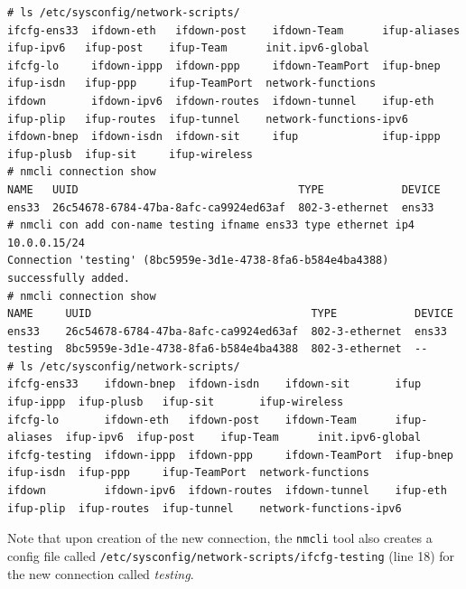 \vspace{-15pt}
\begin{verbatim}
# ls /etc/sysconfig/network-scripts/
ifcfg-ens33  ifdown-eth   ifdown-post    ifdown-Team      ifup-aliases  ifup-ipv6   ifup-post    ifup-Team      init.ipv6-global
ifcfg-lo     ifdown-ippp  ifdown-ppp     ifdown-TeamPort  ifup-bnep     ifup-isdn   ifup-ppp     ifup-TeamPort  network-functions
ifdown       ifdown-ipv6  ifdown-routes  ifdown-tunnel    ifup-eth      ifup-plip   ifup-routes  ifup-tunnel    network-functions-ipv6
ifdown-bnep  ifdown-isdn  ifdown-sit     ifup             ifup-ippp     ifup-plusb  ifup-sit     ifup-wireless
# nmcli connection show
NAME   UUID                                  TYPE            DEVICE 
ens33  26c54678-6784-47ba-8afc-ca9924ed63af  802-3-ethernet  ens33  
# nmcli con add con-name testing ifname ens33 type ethernet ip4 10.0.0.15/24
Connection 'testing' (8bc5959e-3d1e-4738-8fa6-b584e4ba4388) successfully added.
# nmcli connection show
NAME     UUID                                  TYPE            DEVICE 
ens33    26c54678-6784-47ba-8afc-ca9924ed63af  802-3-ethernet  ens33  
testing  8bc5959e-3d1e-4738-8fa6-b584e4ba4388  802-3-ethernet  --     
# ls /etc/sysconfig/network-scripts/
ifcfg-ens33    ifdown-bnep  ifdown-isdn    ifdown-sit       ifup          ifup-ippp  ifup-plusb   ifup-sit       ifup-wireless
ifcfg-lo       ifdown-eth   ifdown-post    ifdown-Team      ifup-aliases  ifup-ipv6  ifup-post    ifup-Team      init.ipv6-global
ifcfg-testing  ifdown-ippp  ifdown-ppp     ifdown-TeamPort  ifup-bnep     ifup-isdn  ifup-ppp     ifup-TeamPort  network-functions
ifdown         ifdown-ipv6  ifdown-routes  ifdown-tunnel    ifup-eth      ifup-plip  ifup-routes  ifup-tunnel    network-functions-ipv6
\end{verbatim}
\vspace{-10pt}

\noindent
Note that upon creation of the new connection, the \verb|nmcli| tool also creates a config file called \verb|/etc/sysconfig/network-scripts/ifcfg-testing| (line 18) for the new connection called \textit{testing}.

